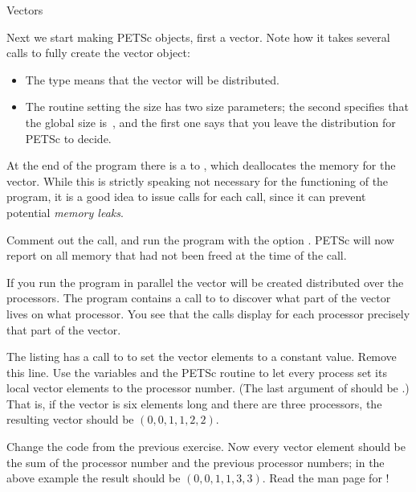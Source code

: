  {Vectors}

Next we start making PETSc objects, first a vector.
Note how it takes several calls to fully create the vector
object:
\begin{itemize}
\item The type  means that the vector will be distributed.
\item The routine setting the size has two size parameters; the second
  specifies that the global size is~, and the first one says
  that  you leave the distribution for PETSc to decide.
\end{itemize}

At the end of the program there is a to , which
deallocates the memory for the vector. While this is strictly speaking
not necessary for the functioning of the program, it is a good idea to
issue  calls for each  call, since it can prevent
potential \emph{memory leaks}.

\begin{exercise}
  Comment out the  call, and run the program with the
  option . PETSc will now report on all memory that
  had not been freed at the time of the  call.
\end{exercise}

If you run the program in parallel the vector will be created
distributed over the processors. The program contains 
a call to  to discover what part of the vector
lives on what processor. You see that the  calls display
for each processor precisely that part of the vector.

\begin{exercise}
  The listing has a call to  to set the vector elements to a
  constant value. Remove this line.
  Use the  variables and the PETSc routine
   to let every process set its
  local vector elements to the processor number. (The last argument of
   should be .) That is, if the
  vector is six elements long and there are three processors, the
  resulting vector should be $(0,0,1,1,2,2)$.
\end{exercise}

\begin{exercise}
  Change the code from the previous exercise. Now every vector element
  should be the sum of the processor number and the previous
  processor numbers; in the above example the result should be
  $(0,0,1,1,3,3)$. Read the man page for !
\end{exercise}

